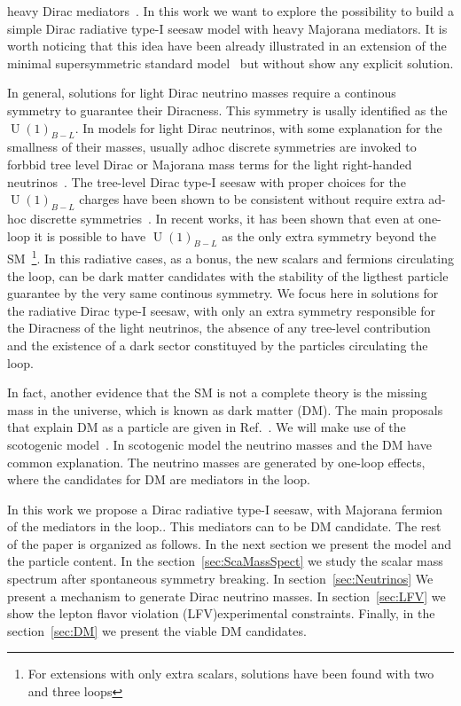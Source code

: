 \documentclass[12pt]{article}
\begin{document}
heavy Dirac mediators~\cite{}.
In this work we want to explore the
possibility to build a simple Dirac radiative type-I seesaw  model with 
heavy Majorana mediators.
It is worth noticing that this idea have
been already illustrated in an extension of the minimal supersymmetric
standard model~\cite{Demir:2007dt} but without show any explicit
solution.

In general, solutions for light Dirac neutrino masses require a continous symmetry to guarantee their Diracness. This symmetry is usally identified as the $\operatorname{U}(1)_{B-L}$. In models for light Dirac neutrinos, with some explanation for the smallness of
their masses, usually  adhoc discrete symmetries are invoked to forbbid
tree level Dirac or Majorana mass terms for the light right-handed neutrinos~\cite{Han:2018zcn,Wang:2017mcy}.
The tree-level Dirac type-I seesaw with
proper choices for the $\operatorname{U}(1)_{B-L}$ charges have been shown to be consistent without require extra ad-hoc discrette symmetries~\cite{}.
In recent works, it has been shown that even at one-loop it is possible to have  $\operatorname{U}(1)_{B-L}$ as the only extra symmetry beyond the SM~\cite{Calle:2018ovc, Bonilla:2018ynb, Saad:2019bqf}\footnote{
  For extensions with only extra scalars, solutions have been found with two and three loops}.
In this radiative cases, as a bonus,  the new scalars and fermions circulating the loop, can be dark matter candidates with the stability of the ligthest particle guarantee by the  very same continous symmetry.
We focus here in solutions for the radiative Dirac type-I seesaw, with
only an extra symmetry responsible for the Diracness of the light neutrinos, the absence of any tree-level contribution and the existence of a dark sector constituyed by the particles circulating the loop.

In fact, another evidence that the SM is not a complete theory is the missing mass in the universe, which is known as dark matter (DM). The main proposals that explain DM as a particle are given in Ref.~\cite{Bertone:2004pz}. We will make use of the scotogenic model~\cite{Ma:2006km}. In scotogenic model the neutrino masses and the DM have common explanation. The neutrino masses are generated by one-loop effects, where the candidates for DM are mediators in the loop.

In this work we propose a Dirac radiative type-I seesaw,
with Majorana fermion of the mediators in the loop.. This mediators can to be DM candidate. The rest of the paper is organized as follows. In the next section we present the model and the particle content. In the section~\ref{sec:ScaMassSpect} we study the scalar mass spectrum after spontaneous symmetry breaking. In section~\ref{sec:Neutrinos} We present a mechanism to generate Dirac neutrino masses. In section~\ref{sec:LFV} we show the lepton flavor violation (LFV)experimental  constraints. Finally, in the section~\ref{sec:DM} we present the viable DM candidates.
\end{document}
